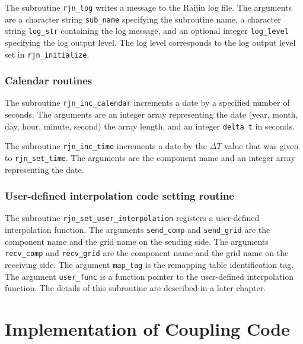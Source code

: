 \documentclass[11pt,a4paper]{report}
\begin{document}
The subroutine \texttt{rjn\_log}
writes a message to the Raijin log file.
The arguments are
a character string \texttt{sub\_name}
specifying the subroutine name,
a character string \texttt{log\_str}
containing the log message,
and an optional integer \texttt{log\_level}
specifying the log output level.
The log level corresponds to
the log output level set in \texttt{rjn\_initialize}.

\subsection{Calendar routines}

The subroutine \texttt{rjn\_inc\_calendar}
increments a date by a specified number of seconds.
The arguments are
an integer array representing the date
(year, month, day, hour, minute, second)
the array length, and an integer \texttt{delta\_t} in seconds.

The subroutine \texttt{rjn\_inc\_time}
increments a date by the $\Delta T$ value
that was given to \texttt{rjn\_set\_time}.
The arguments are the component name
and an integer array representing the date.

\subsection{User-defined interpolation code setting routine}

The subroutine \texttt{rjn\_set\_user\_interpolation}
registers a user-defined interpolation function.
The arguments \texttt{send\_comp} and \texttt{send\_grid}
are the component name and the grid name
on the sending side.
The arguments \texttt{recv\_comp} and \texttt{recv\_grid}
are the component name and the grid name
on the receiving side.
The argument \texttt{map\_tag}
is the remapping table identification tag.
The argument \texttt{user\_func}
is a function pointer to the user-defined interpolation function.
The details of this subroutine are described
in a later chapter.


\chapter{Implementation of Coupling Code}
\end{document}

